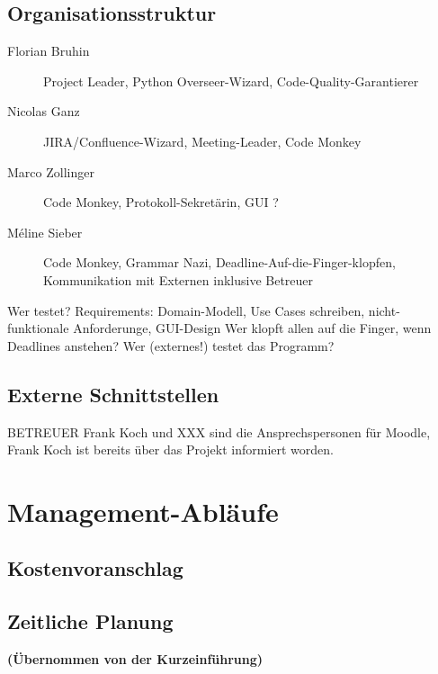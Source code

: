 \documentclass[a4paper]{article}
\begin{document}
\subsection{Organisationsstruktur}
\begin{description}
\item[Florian Bruhin] Project Leader, Python Overseer-Wizard, Code-Quality-Garantierer
\item[Nicolas Ganz] JIRA/Confluence-Wizard, Meeting-Leader, Code Monkey
\item[Marco Zollinger] Code Monkey, Protokoll-Sekretärin, GUI ?
\item[Méline Sieber] Code Monkey, Grammar Nazi, Deadline-Auf-die-Finger-klopfen, Kommunikation mit Externen inklusive Betreuer
\end{description}

Wer testet?
Requirements: Domain-Modell, Use Cases schreiben, nicht-funktionale Anforderunge, GUI-Design
Wer klopft allen auf die Finger, wenn Deadlines anstehen?
Wer (externes!) testet das Programm?

\subsection{Externe Schnittstellen}
BETREUER
Frank Koch und XXX sind die Ansprechspersonen für Moodle, Frank Koch ist bereits über das Projekt informiert worden.

\section{Management-Abläufe}
\subsection{Kostenvoranschlag}

\subsection{Zeitliche Planung}
\textbf{(Übernommen von der Kurzeinführung)}
\end{document}
